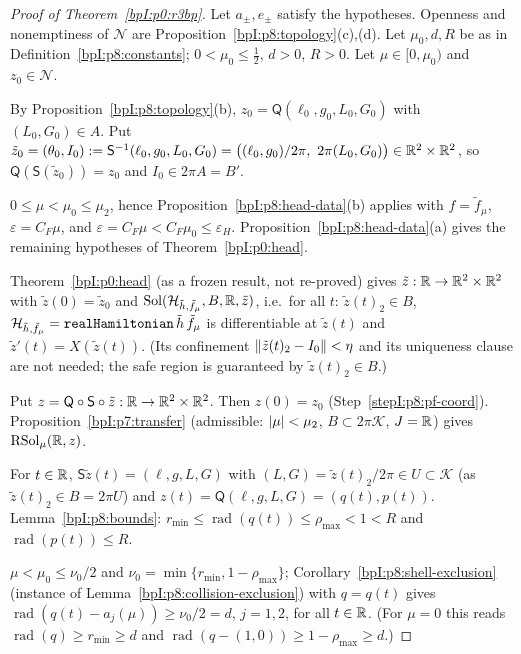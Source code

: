 \begin{proof}[Proof of Theorem~\ref{bpI:p0:r3bp}]
Let $a_\pm,e_\pm$ satisfy the hypotheses. Openness and nonemptiness of $\mathcal N$ are Proposition~\ref{bpI:p8:topology}(c),(d). Let $\mu_0,d,R$ be as in Definition~\ref{bpI:p8:constants}; $0<\mu_0\le\tfrac12$, $d>0$, $R>0$. Let $\mu\in[0,\mu_0)$ and $z_0\in\mathcal N$.

\label{stepI:p8:pf-coord} By Proposition~\ref{bpI:p8:topology}(b), $z_0=\mathsf Q(\ell_0,g_0,L_0,G_0)$ with $(L_0,G_0)\in A$. Put $\tilde z_0=(\theta_0,I_0):=\mathsf S^{-1}(\ell_0,g_0,L_0,G_0)=\bigl((\ell_0,g_0)/2\pi,\ 2\pi(L_0,G_0)\bigr)\in\R^2\times\R^2$, so $\mathsf Q(\mathsf S(\tilde z_0))=z_0$ and $I_0\in2\pi A=B'$.

\label{stepI:p8:pf-small} $0\le\mu<\mu_0\le\mu_2$, hence Proposition~\ref{bpI:p8:head-data}(b) applies with $f=\tilde f_\mu$, $\varepsilon=C_F\mu$, and $\varepsilon=C_F\mu<C_F\mu_0\le\varepsilon_H$. Proposition~\ref{bpI:p8:head-data}(a) gives the remaining hypotheses of Theorem~\ref{bpI:p0:head}.

\label{stepI:p8:pf-head} Theorem~\ref{bpI:p0:head} (as a frozen result, not re-proved) gives $\tilde z:\mathbb{R}\to\mathbb{R}^2\times\mathbb{R}^2$ with $\tilde z(0)=\tilde z_0$ and $\mathrm{Sol}(\mathcal H_{\tilde h,\tilde f_\mu},B,\mathbb{R},\tilde z)$, i.e.\ for all $t$: $\tilde z(t)_2\in B$, $\mathcal H_{\tilde h,\tilde f_\mu}=\texttt{realHamiltonian}\,\tilde h\,\tilde f_\mu$ is differentiable at $\tilde z(t)$ and $\tilde z'(t)=X(\tilde z(t))$. (Its confinement $\lVert \tilde z(t)_2-I_0\rVert<\eta$ and its uniqueness clause are not needed; the safe region is guaranteed by $\tilde z(t)_2\in B$.)

\label{stepI:p8:pf-sol} Put $z=\mathsf Q\circ\mathsf S\circ\tilde z:\mathbb{R}\to\mathbb{R}^2\times\mathbb{R}^2$. Then $z(0)=z_0$ (Step~\ref{stepI:p8:pf-coord}). Proposition~\ref{bpI:p7:transfer} (admissible: $\lvert \mu\rvert<\mu_2$, $B\subset2\pi\mathcal K$, $J=\mathbb{R}$) gives $\mathrm{RSol}_\mu(\mathbb{R},z)$.

\label{stepI:p8:pf-bounds} For $t\in\mathbb{R}$, $\mathsf S\tilde z(t)=(\ell,g,L,G)$ with $(L,G)=\tilde z(t)_2/2\pi\in U\subset\mathcal K$ (as $\tilde z(t)_2\in B=2\pi U$) and $z(t)=\mathsf Q(\ell,g,L,G)=(q(t),p(t))$. Lemma~\ref{bpI:p8:bounds}: $r_{\min}\le\operatorname{rad}(q(t))\le\rho_{\max}<1<R$ and $\operatorname{rad}(p(t))\le R$.

\label{stepI:p8:pf-dist} $\mu<\mu_0\le\nu_0/2$ and $\nu_0=\min\{r_{\min},1-\rho_{\max}\}$; Corollary~\ref{bpI:p8:shell-exclusion} (instance of Lemma~\ref{bpI:p8:collision-exclusion}) with $q=q(t)$ gives $\operatorname{rad}(q(t)-a_j(\mu))\ge\nu_0/2=d$, $j=1,2$, for all $t\in\mathbb{R}$. (For $\mu=0$ this reads $\operatorname{rad}(q)\ge r_{\min}\ge d$ and $\operatorname{rad}(q-(1,0))\ge1-\rho_{\max}\ge d$.)


\end{proof}
